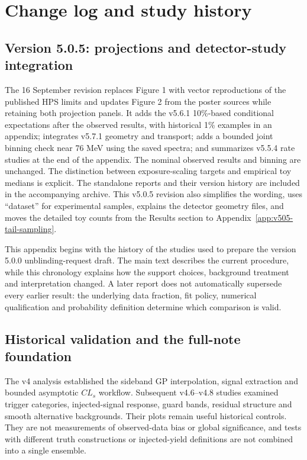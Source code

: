\section{Change log and study history}
\label{v5-sec:history}\label{sec:v5-history}

\subsection{Version 5.0.5: projections and detector-study integration}
The 16 September revision replaces Figure 1 with vector reproductions of
the published HPS limits and updates Figure 2 from the poster sources while
retaining both projection panels. It adds the v5.6.1 10\%-based conditional
expectations after the observed results, with historical 1\% examples in
an appendix; integrates v5.7.1 geometry and transport; adds a bounded joint binning check near 76 MeV using the saved spectra; and summarizes v5.5.4 rate studies at the end
of the appendix. The nominal observed results and binning are unchanged.
The distinction between exposure-scaling targets and empirical toy medians
is explicit. The standalone reports and their version history are included in the
accompanying archive. This v5.0.5 revision also simplifies the wording,
uses ``dataset'' for experimental samples, explains the detector geometry
files, and moves the detailed toy counts from the Results section to
Appendix~\ref{app:v505-tail-sampling}.

This appendix begins with the history of the studies used to prepare the
version 5.0.0 unblinding-request draft. The main text describes
the current procedure, while this chronology explains how the
support choices, background treatment and interpretation changed.
A later report does not automatically supersede every earlier result:
the underlying data fraction, fit policy, numerical qualification and
probability definition determine which comparison is valid.

\subsection{Historical validation and the full-note foundation}
The v4 analysis established the sideband GP interpolation, signal
extraction and bounded asymptotic $CL_s$ workflow. Subsequent v4.6--v4.8
studies examined trigger categories, injected-signal response, guard bands,
residual structure and smooth alternative backgrounds. Their plots remain
useful historical controls. They are not measurements of observed-data
bias or global significance, and tests with different truth constructions
or injected-yield definitions are not combined into a single ensemble.

